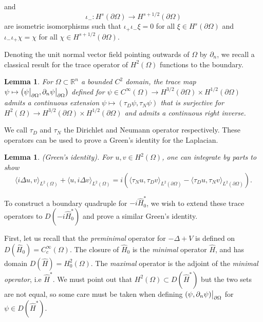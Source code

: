 \documentclass{article}
\numberwithin{equation}{section}
\newtheorem{lemma}{Lemma}[section]
\newtheorem*{lemma*}{Lemma}
\begin{document}
and 
\begin{equation}
    \iota_-:H^{s}(\partial \Omega)\to H^{s+1/2}(\partial \Omega)
\end{equation}
are isometric isomorphisms such that $\iota_+\iota_- \xi=0$ for all $\xi \in H^s(\partial \Omega)$ and $\iota_- \iota_+ \chi=\chi$ for all $\chi \in H^{s+1/2}(\partial \Omega)$.
\par
Denoting the unit normal vector field pointing outwards of $\Omega$ by $\partial_n$, we recall a classical result for the trace operator of $H^2(\Omega)$ functions to the boundary.
\begin{lemma}\label{Trace Definition}
    \cite[Theorem 8.3]{LH1972}\cite[Theorem 1.5.1.2]{Grisvard} For $\Omega\subset \mathbb{R}^n$ a bounded $C^2$ domain, the trace map $\psi \mapsto \left(\psi\big{|}_{\partial \Omega}, \partial_n \psi \big{|}_{\partial \Omega} \right)$ defined for $\psi \in C^\infty(\Omega) \to H^{{3/2}}(\partial \Omega)\times H^{{1/2}}(\partial \Omega)$ admits a continuous extension $\psi \mapsto \left(\tau_D \psi, \tau_N \psi \right)$ that is surjective for $H^2(\Omega)\to H^{3/2}(\partial \Omega)\times H^{{1/2}}(\partial \Omega)$ and admits a continuous right inverse. 
\end{lemma}
We call $\tau_D$ and $\tau_N$ the Dirichlet and Neumann operator respectively. These operators can be used to prove a Green's identity for the Laplacian.
\begin{lemma*}\label{Green's Identity}\textit{(Green's identity).}
    For $u,v \in H^2(\Omega)$, one can integrate by parts to show
    \begin{equation}
        \langle i\Delta u,v\rangle_{L^2(\Omega)}+ \langle u,i\Delta v \rangle_{L^2(\Omega)}=i\left( \langle \tau_N u, \tau_D v\rangle_{L^2(\partial \Omega)} -\langle  \tau_D u, \tau_N v\rangle_{L^2(\partial \Omega)}\right).
    \end{equation}
\end{lemma*}
To construct a boundary quadruple for $-i\hat{H}_0^*$, we wish to extend these trace operators to $D(-i\hat{H}_0^*)$ and prove a similar Green's identity.
\par
First, let us recall that the \textit{preminimal} operator for $-\Delta+V$ is defined on $D(\hat{H}_0)={C_c^\infty(\Omega)}$. The closure of $\hat{H}_0$ is the \textit{minimal} operator $\hat{H}$, and has domain $D(\hat{H})=H^2_0(\Omega)$. The \textit{maximal} operator is the adjoint of the \textit{minimal operator}, i.e $\hat{H}^*$. We must point out that $H^2(\Omega)\subset D(\hat{H}^*)$ but the two sets are not equal, so some care must be taken when defining $(\psi, \partial_n \psi)\big{|}_{\partial \Omega}$ for $\psi \in D(\hat{H}^*)$.
\end{document}
